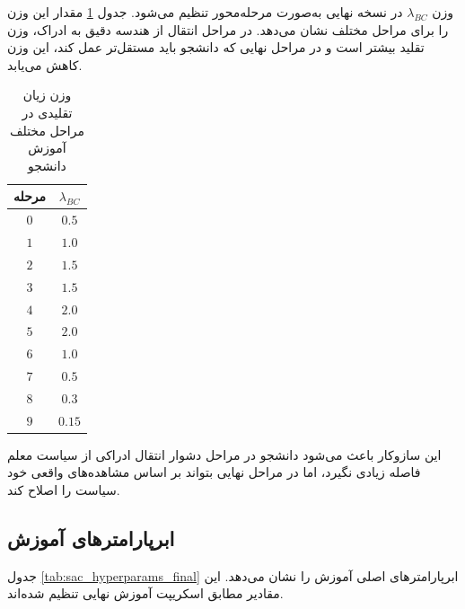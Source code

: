 وزن \(\lambda_{BC}\) در نسخه نهایی به‌صورت مرحله‌محور تنظیم می‌شود. جدول \ref{tab:bc_weight_by_stage_final} مقدار این وزن را برای مراحل مختلف نشان می‌دهد. در مراحل انتقال از هندسه دقیق به ادراک، وزن تقلید بیشتر است و در مراحل نهایی که دانشجو باید مستقل‌تر عمل کند، این وزن کاهش می‌یابد.

\begin{table}[ht]
	\centering
	\caption{وزن زیان تقلیدی در مراحل مختلف آموزش دانشجو}
	\label{tab:bc_weight_by_stage_final}
	\begin{tabular}{|c|c|}
		\hline
		\textbf{مرحله} & \(\lambda_{BC}\) \\
		\hline
		$0$ & $0.5$ \\
		\hline
		$1$ & $1.0$ \\
		\hline
		$2$ & $1.5$ \\
		\hline
		$3$ & $1.5$ \\
		\hline
		$4$ & $2.0$ \\
		\hline
		$5$ & $2.0$ \\
		\hline
		$6$ & $1.0$ \\
		\hline
		$7$ & $0.5$ \\
		\hline
		$8$ & $0.3$ \\
		\hline
		$9$ & $0.15$ \\
		\hline
	\end{tabular}
\end{table}

این سازوکار باعث می‌شود دانشجو در مراحل دشوار انتقال ادراکی از سیاست معلم فاصله زیادی نگیرد، اما در مراحل نهایی بتواند بر اساس مشاهده‌های واقعی خود سیاست را اصلاح کند.

\subsection{ابرپارامترهای آموزش}
\label{subsec:training_hyperparameters_final}

جدول \ref{tab:sac_hyperparams_final} ابرپارامترهای اصلی آموزش را نشان می‌دهد. این مقادیر مطابق اسکریپت آموزش نهایی تنظیم شده‌اند.

